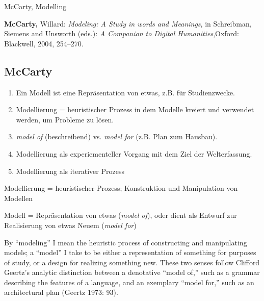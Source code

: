 \begin{frame}[allowframebreaks]{McCarty, Modelling}
\begin{block}{}
\textbf{McCarty,} Willard: \emph{Modeling: A Study in words and Meanings}, in Schreibman, Siemens and Unsworth (eds.): \emph{A Companion to Digital Humanities},Oxford: Blackwell, 2004, 254--270.
\end{block}
\subsection{McCarty}
\begin{enumerate}
    \item Ein Modell ist eine Repräsentation von etwas, z.B. für Studienzwecke.
    \item Modellierung = heuristischer Prozess in dem Modelle kreiert und verwendet werden, um Probleme zu lösen.
    \item \emph{model of} (beschreibend) vs. \emph{model for} (z.B. Plan zum Hausbau).
    \item Modellierung als experiementeller Vorgang mit dem Ziel der Welterfassung.
    \item Modellierung als iterativer Prozess
\end{enumerate}
\framebreak

\begin{block}{Modellierung}
= heuristischer Prozess; Konstruktion und Manipulation von Modellen
\end{block}

\begin{block}{Modell}
= Repräsentation von etwas (\emph{model of}), oder dient als Entwurf zur Realisierung von etwas Neuem (\emph{model for})
\end{block}
\framebreak

\begin{block}{\cite[255]{mccarty2004}}
\footnotesize
By ``modeling'' I mean the heuristic process of constructing and manipulating models; 
a ``model'' I take to be either a representation of
something for purposes of study, or a design for realizing something new. These two senses follow Clifford Geertz’s analytic distinction
between a denotative ``model of,'' such as a grammar describing the features of a language, and an exemplary ``model for,'' such as an
architectural plan
(Geertz 1973: 93).
\end{block}


\end{frame}
